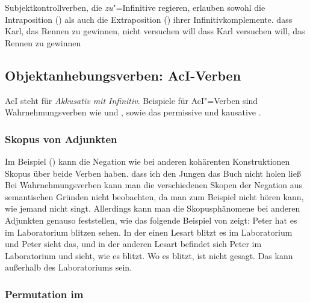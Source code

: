 Subjektkontrollverben, die \emph{zu}"=Infinitive regieren, 
erlauben sowohl die Intraposition () als auch die Extraposition
() ihrer Infinitivkomplemente.
\ea
dass Karl, das Rennen zu gewinnen, nicht versuchen will
\z
\ea
dass    Karl versuchen will,    das Rennen zu gewinnen
\z
{}%

\subsection{Objektanhebungsverben: AcI-Verben}
\label{sec-aci}

AcI
steht für \emph{Akkusativ mit Infinitiv}. 
Beispiele für AcI"=Verben sind Wahrnehmungsverben wie  und 
, sowie das permissive und kausative . 

\subsubsection{Skopus von Adjunkten}
\label{sec-aci-scope}

Im Beispiel () kann die Negation wie bei anderen kohärenten Konstruktionen
Skopus über beide Verben haben.
\ea
dass ich den Jungen das Buch nicht holen ließ
\z
%
Bei Wahrnehmungsverben kann man die verschiedenen Skopen der Negation
aus semantischen Gründen nicht beobachten, da man zum Beispiel
nicht hören kann, wie jemand nicht singt. Allerdings kann man
die Skopusphänomene bei anderen Adjunkten genauso feststellen, wie
das folgende Beispiel von \citet[]{Puetz82a}
zeigt:
\ea
Peter hat es im Laboratorium blitzen sehen.
\z
In der einen Lesart blitzt es im Laboratorium und Peter sieht das, und
in der anderen Lesart befindet sich Peter im Laboratorium und sieht,
wie es blitzt. Wo es blitzt, ist nicht gesagt. Das kann außerhalb
des Laboratoriums sein.


\subsubsection{Permutation im \mf}
\label{sec-aci-perm-mf}


